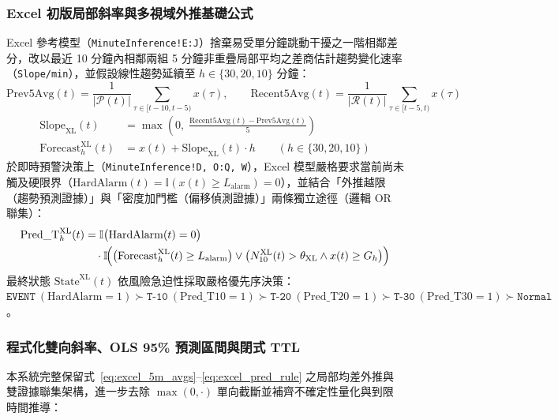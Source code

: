 \documentclass[fontset=none, a4paper, 12pt]{ctexart}
\begin{document}
\begin{doublespace}
\subsubsection{Excel 初版局部斜率與多視域外推基礎公式}
Excel 參考模型（\texttt{MinuteInference!E:J}）捨棄易受單分鐘跳動干擾之一階相鄰差分，改以最近 10 分鐘內相鄰兩組 5 分鐘非重疊局部平均之差商估計趨勢變化速率（\texttt{Slope/min}），並假設線性趨勢延續至 $h \in \{30, 20, 10\}$ 分鐘：
\begin{equation}
\mathrm{Prev5Avg}(t) = \frac{1}{|\mathcal{P}(t)|}\sum_{\tau\in[t-10,t-5)} x(\tau), \qquad
\mathrm{Recent5Avg}(t) = \frac{1}{|\mathcal{R}(t)|}\sum_{\tau\in[t-5,t)} x(\tau)
\label{eq:excel_5m_avgs}
\end{equation}
\begin{align}
\mathrm{Slope}_{\mathrm{XL}}(t) &= \max\!\left(0,\; \frac{\mathrm{Recent5Avg}(t) - \mathrm{Prev5Avg}(t)}{5}\right) \nonumber \\
\mathrm{Forecast}_{h}^{\mathrm{XL}}(t) &= x(t) + \mathrm{Slope}_{\mathrm{XL}}(t)\cdot h \qquad (h\in\{30,20,10\})
\label{eq:excel_forecast}
\end{align}
於即時預警決策上（\texttt{MinuteInference!D, O:Q, W}），Excel 模型嚴格要求當前尚未觸及硬限界（$\mathrm{HardAlarm}(t) = \mathbb{I}(x(t) \ge L_{\mathrm{alarm}}) = 0$），並結合「外推越限（趨勢預測證據）」與「密度加門檻（偏移偵測證據）」兩條獨立途徑（邏輯 OR 聯集）：
\begin{equation}
\begin{split}
\mathrm{Pred\_T}_{h}^{\mathrm{XL}}(t) &= \mathbb{I}\bigl(\mathrm{HardAlarm}(t) = 0\bigr) \\
&\quad \cdot \mathbb{I}\!\Bigl(\bigl(\mathrm{Forecast}_{h}^{\mathrm{XL}}(t) \ge L_{\mathrm{alarm}}\bigr) \lor \bigl(N_{10}^{\mathrm{XL}}(t) > \theta_{\mathrm{XL}} \land x(t) \ge G_h\bigr)\Bigr)
\end{split}
\label{eq:excel_pred_rule}
\end{equation}
最終狀態 $\mathrm{State}^{\mathrm{XL}}(t)$ 依風險急迫性採取嚴格優先序決策：$\texttt{EVENT}\ (\mathrm{HardAlarm}=1) \succ \texttt{T-10}\ (\mathrm{Pred\_T10}=1) \succ \texttt{T-20}\ (\mathrm{Pred\_T20}=1) \succ \texttt{T-30}\ (\mathrm{Pred\_T30}=1) \succ \texttt{Normal}$。

\subsubsection{程式化雙向斜率、OLS 95\% 預測區間與閉式 TTL}
本系統完整保留式~\eqref{eq:excel_5m_avgs}--\eqref{eq:excel_pred_rule} 之局部均差外推與雙證據聯集架構，進一步去除 $\max(0, \cdot)$ 單向截斷並補齊不確定性量化與到限時間推導：


\end{doublespace}
\end{document}
